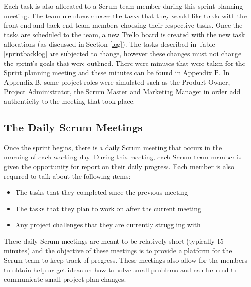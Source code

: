 \documentclass[12pt,onecolumn]{article}
\begin{document}
	Each task is also allocated to a Scrum team member during this sprint planning meeting. The team members choose the tasks that they would like to do with the front-end and back-end team members choosing their respective tasks. Once the tasks are scheduled to the team, a new Trello board is created with the new task allocations (as discussed in Section \ref{log}). The tasks described in Table \ref{sprintbacklog} are subjected to change, however these changes must not change the sprint's goals that were outlined. There were minutes that were taken for the Sprint planning meeting and these minutes can be found in Appendix B. In Appendix B, some project roles were simulated such as the Product Owner, Project Administrator, the Scrum Master and Marketing Manager in order add authenticity to the meeting that took place.
	
	\subsection{The Daily Scrum Meetings}
	
	 Once the sprint begins, there is a daily Scrum meeting that occurs in the morning of each working day. During this meeting, each Scrum team member is given the opportunity for report on their daily progress. Each member is also required to talk about the following items:
	
	\begin{itemize}
		\item The tasks that they completed since the previous meeting
		\item The tasks that they plan to work on after the current meeting
		\item Any project challenges that they are currently struggling with 
	\end{itemize}
	
	These daily Scrum meetings are meant to be relatively short (typically 15 minutes) and the objective of these meetings is to provide a platform for the Scrum team to keep track of progress. These meetings also allow for the members to obtain help or get ideas on how to solve small problems and can be used to communicate small project plan changes. 
	
\end{document}
